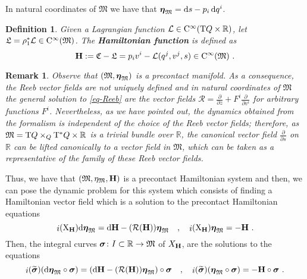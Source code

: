 \documentclass[12pt]{report}
\newtheorem{definition}[teor]{Definition}
\newtheorem{remark}[teor]{Remark}
\def\beq{\begin{equation}}
\def\eeq{\end{equation}}
\def\derpar#1#2{\frac{\partial{#1}}{\partial{#2}}}
\def\Lag{{\cal L}}
\def\d{{\rm d}}
\def\Real{\mathbb{R}}
\def\bmeta{\mbox{\boldmath $\eta$}}
\def\X{{\rm X}}
\def\Tan{{\rm T}}
\def\inn{\mathop{i}\nolimits}
\def\Cinfty{{\rm C}^\infty}
\newcommand{\Reeb}{\mathcal{R}}
\begin{document}
In natural coordinates of $\mathfrak{M}$ we have that
$\bmeta_{\mathfrak{M}}=\d s-p_i\,\d q^i$.

\begin{definition}
Given a Lagrangian function $\Lag\in\Cinfty(\Tan Q\times\Real)$, let
$\mathfrak{L}=\rho_1^*\Lag\in\Cinfty(\mathfrak{M})$.
The \textbf{Hamiltonian function} is defined as
\beq
{\bf H}:=\mathfrak{C}-\mathfrak{L} =p_i v^i-\Lag (q^j,v^j,s)\in\Cinfty(\mathfrak{M}) \ .
\label{Hamf}
\eeq
\end{definition}

\begin{remark}{\rm
Observe that $(\mathfrak{M},\bmeta_{\mathfrak{M}})$ is a precontact manifold.
As a consequence, the Reeb vector fields are not uniquely defined and
in natural coordinates of $\mathfrak{M}$ the general solution to \eqref{eq-Reeb} are the vector fields
$\displaystyle \Reeb=\derpar{}{z}+F^i\derpar{}{v^i}$
for arbitrary functions $F^i$.
Nevertheless, as we have pointed out, 
the dynamics obtained from the formalism is independent of the choice of the Reeb vector fields;
therefore, as $\mathfrak{M}=\Tan Q\times_Q\Tan^*Q\times\Real$
is a trivial bundle over $\Real$,
the canonical vector field $\displaystyle \derpar{}{s}$ on $\Real$
can be lifted canonically to a vector field in $\mathfrak{M}$,
which can be taken as a representative of the family of
these Reeb vector fields.
}\end{remark}

Thus, we have that $(\mathfrak{M},\eta_\mathfrak{M},{\bf H})$
is a precontact Hamiltonian system and then,
we can pose the dynamic problem for this system which consists of finding
a Hamiltonian vector field which is a solution to the precontact Hamiltonian equations
\begin{equation}
\label{Whamilton-contact-eqs}
\inn(\X_{\bf H})\d\bmeta_{\mathfrak{M}}=\d{\bf H}-({\Reeb}({\bf H}))\bmeta_{\mathfrak{M}}
\quad ,\quad
\inn(\X_{\bf H})\bmeta_{\mathfrak{M}}=-{\bf H}\ .
\end{equation}
Then, the integral curves $\mbox{\boldmath $\sigma$}\colon I\subset\Real\to\mathfrak{M}$ of $X_{\bf H}$,
are the solutions to the equations
\begin{equation}
\label{Whamilton-contactc-curves-eqs}
\inn(\widetilde{\mbox{\boldmath $\sigma$}})(\d\bmeta_{\mathfrak{M}}\circ\mbox{\boldmath $\sigma$})=\left(\d{\bf H}-({\Reeb}({\bf H}))\bmeta_{\mathfrak{M}}\right)\circ\mbox{\boldmath $\sigma$}
\quad ,\quad
 \inn(\widetilde{\mbox{\boldmath $\sigma$}})(\bmeta_{\mathfrak{M}}\circ\mbox{\boldmath $\sigma$})=-{\bf H}\circ\mbox{\boldmath $\sigma$} \ .
    \end{equation}
\end{document}
